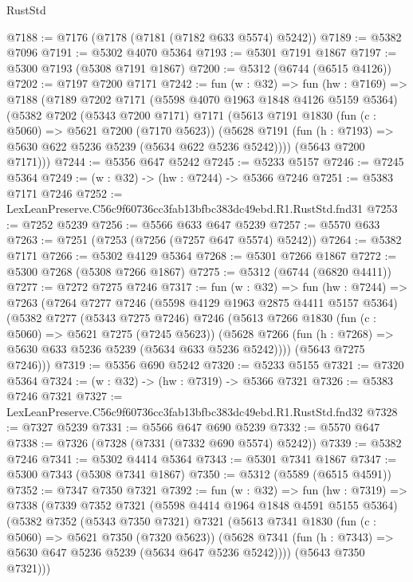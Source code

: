\begin{lexlean}{RustStd}
\begin{coremodule}
@7188 := @7176 (@7178 (@7181 (@7182 @633 @5574) @5242))
@7189 := @5382 @7096
@7191 := @5302 @4070 @5364
@7193 := @5301 @7191 @1867
@7197 := @5300 @7193 (@5308 @7191 @1867)
@7200 := @5312 (@6744 (@6515 @4126))
@7202 := @7197 @7200 @7171
@7242 := fun (w : @32) =>
  fun (hw : @7169) =>
  @7188
    (@7189
      @7202
      @7171
      (@5598 @4070 @1963 @1848 @4126 @5159 @5364)
      (@5382
        @7202
        (@5343 @7200 @7171)
        @7171
        (@5613
          @7191
          @1830
          (fun (c : @5060) => @5621 @7200 (@7170 @5623))
          (@5628 @7191 (fun (h : @7193) => @5630 @622 @5236 @5239 (@5634 @622 @5236 @5242))))
        (@5643 @7200 @7171)))
@7244 := @5356 @647 @5242
@7245 := @5233 @5157
@7246 := @7245 @5364
@7249 := (w : @32) -> (hw : @7244) -> @5366 @7246
@7251 := @5383 @7171 @7246
@7252 := LexLeanPreserve.C56c9f60736cc3fab13bfbc383dc49ebd.R1.RustStd.fnd31
@7253 := @7252 @5239
@7256 := @5566 @633 @647 @5239
@7257 := @5570 @633
@7263 := @7251 (@7253 (@7256 (@7257 @647 @5574) @5242))
@7264 := @5382 @7171
@7266 := @5302 @4129 @5364
@7268 := @5301 @7266 @1867
@7272 := @5300 @7268 (@5308 @7266 @1867)
@7275 := @5312 (@6744 (@6820 @4411))
@7277 := @7272 @7275 @7246
@7317 := fun (w : @32) =>
  fun (hw : @7244) =>
  @7263
    (@7264
      @7277
      @7246
      (@5598 @4129 @1963 @2875 @4411 @5157 @5364)
      (@5382
        @7277
        (@5343 @7275 @7246)
        @7246
        (@5613
          @7266
          @1830
          (fun (c : @5060) => @5621 @7275 (@7245 @5623))
          (@5628 @7266 (fun (h : @7268) => @5630 @633 @5236 @5239 (@5634 @633 @5236 @5242))))
        (@5643 @7275 @7246)))
@7319 := @5356 @690 @5242
@7320 := @5233 @5155
@7321 := @7320 @5364
@7324 := (w : @32) -> (hw : @7319) -> @5366 @7321
@7326 := @5383 @7246 @7321
@7327 := LexLeanPreserve.C56c9f60736cc3fab13bfbc383dc49ebd.R1.RustStd.fnd32
@7328 := @7327 @5239
@7331 := @5566 @647 @690 @5239
@7332 := @5570 @647
@7338 := @7326 (@7328 (@7331 (@7332 @690 @5574) @5242))
@7339 := @5382 @7246
@7341 := @5302 @4414 @5364
@7343 := @5301 @7341 @1867
@7347 := @5300 @7343 (@5308 @7341 @1867)
@7350 := @5312 (@5589 (@6515 @4591))
@7352 := @7347 @7350 @7321
@7392 := fun (w : @32) =>
  fun (hw : @7319) =>
  @7338
    (@7339
      @7352
      @7321
      (@5598 @4414 @1964 @1848 @4591 @5155 @5364)
      (@5382
        @7352
        (@5343 @7350 @7321)
        @7321
        (@5613
          @7341
          @1830
          (fun (c : @5060) => @5621 @7350 (@7320 @5623))
          (@5628 @7341 (fun (h : @7343) => @5630 @647 @5236 @5239 (@5634 @647 @5236 @5242))))
        (@5643 @7350 @7321)))

\end{coremodule}
\end{lexlean}
